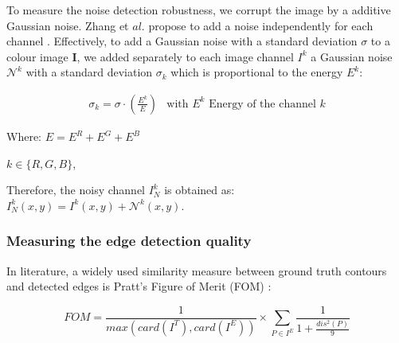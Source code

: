 \documentclass[twoside]{article}
\newcommand\noise{\mathcal{N}} %
\begin{document}
To measure the noise detection robustness, we corrupt the image by a additive Gaussian noise. Zhang et $al.$ propose to add a noise independently for each channel \cite{zhang_ip_2007}. Effectively, to add a Gaussian noise with a standard deviation $\sigma$ to a colour image $\textbf{I}$, we added separately to each image channel $I^k$ a Gaussian noise $\noise^k$ with a standard deviation $\sigma_k$ which is proportional to the energy $E^k$:    



\begin{equation}	
	\begin{array}{cl}
		\sigma_k =\sigma \cdot \left(\frac{E^k}{E}\right) & \text{with $E^k$ Energy of the channel $k$}
	\end{array}
	\label{eq:sigma_k}
\end{equation}

Where: $E=E^R + E^G + E^B$

$k\in\{R,G,B\}$,

Therefore, the noisy channel $I^k_N$ is obtained as: $I^k_N(x,y)= I^k(x,y) + \noise^k(x,y)$.






%  
%



















\subsubsection{Measuring the edge detection quality}
\label{Measuring the edge detection quality}
In literature, a widely used similarity measure between ground truth contours and detected edges is Pratt's Figure of Merit (FOM) \cite{abdou_pieee_1979}:

\begin{equation}
FOM = \frac{1}{max(card(I^T),card(I^E))} \times \sum_{P\in I^E}\frac{1}{1+\frac{dis^2(P)}{9}}
\end{equation}
\end{document}

